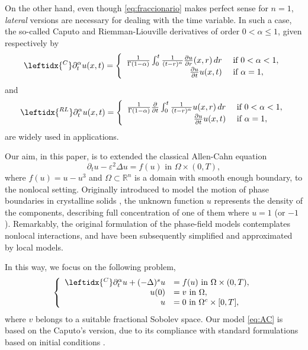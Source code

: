 \documentclass{amsart}
\newcommand{\rn}{{\mathbb{R}^n}}
\newcommand{\rl}{\leftidx{^{RL}}\partial_t^\alpha}
\newcommand{\ppa}{\leftidx{^C}\partial_t^\alpha}
\newcommand{\W}{\Omega}
\newcommand{\eps}{\varepsilon}
\theoremstyle{remark}
\theoremstyle{definition}
\numberwithin{equation}{section}
\begin{document}
On the other hand, even though \eqref{eq:fraccionario} makes perfect sense  for $n=1$,  \emph{lateral} versions are necessary for dealing with the time variable. In such a case, the so-called   Caputo and Riemman-Liouville derivatives of order $0<\alpha\le 1$, given respectively  by  
\begin{equation} \label{eq:caputo}
\ppa u (x,t) =
\left\lbrace
  \begin{array}{rl}
	 \frac{1}{\Gamma(1-\alpha)} \int_0^t \frac{1}{(t-r)^{\alpha}} \frac{\partial u}{\partial r} (x,r) \, dr & \mbox{ if } 0 < \alpha < 1, \\
	\frac{\partial u}{\partial t} u(x,t) &  \mbox{ if } \alpha = 1,
      \end{array}
    \right.
    \end{equation}
and   
 \begin{equation*} \label{eq:RL}
\rl u (x,t) =
\left\lbrace
  \begin{array}{rl}
	 \frac{1}{\Gamma(1-\alpha)}  \frac{\partial  }{\partial t} \int_0^t \frac{1}{(t-r)^{\alpha}} u (x,r) \, dr & \mbox{ if } 0 < \alpha < 1, \\
	\frac{\partial u}{\partial t} u(x,t) &  \mbox{ if } \alpha = 1,
      \end{array}
   \right.
 \end{equation*}
 are widely used in applications. 
 
 Our aim, in this paper, is to extended the classical Allen-Cahn equation
\begin{equation}
\partial_t u -  \eps^2\Delta u   = f(u)  \text{ in } \Omega \times (0,T), 
\label{eq:AC_classic}
\end{equation}
where $f(u) = u - u^3$ and $\W \subset \rn$ is a domain with smooth enough boundary, to the nonlocal setting.  Originally introduced to model the motion of phase boundaries in crystalline solids \cite{AC_79},   the unknown function $u$ represents the density of the components, describing full concentration of one of them where $u = 1$ (or $-1$). Remarkably, the original formulation of the phase-field models \cite{CH_58} contemplates nonlocal interactions, and have been subsequently simplified and approximated by local models. 
 
 In this way, we focus on the following problem, 
\begin{equation}
\left\lbrace
  \begin{array}{rl}      
 \ppa u +  (-\Delta)^s u  & = f(u)  \text{ in } \Omega \times (0,T), \\
 u(0)  & = v  \text{ in } \Omega, \\
u & =  0  \text{ in }  \Omega^c\times[0,T],
\end{array}
    \right.
\label{eq:AC}
\end{equation}
%
where $v$ belongs to a suitable fractional Sobolev space. Our model \eqref{eq:AC} is based on the Caputo's version, due to its compliance with standard formulations based on initial conditions \cite{Diethelm}. 
 
\end{document}
